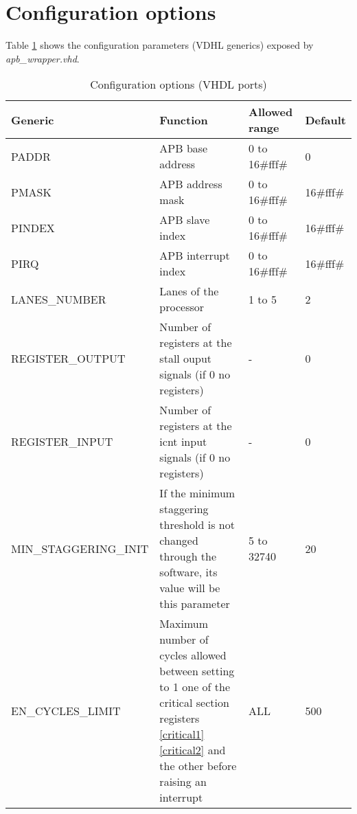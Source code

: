 \section{Configuration options}
\label{confg_chap}
Table \ref{generics} shows the configuration parameters (VDHL generics) exposed by \textit{apb\_wrapper.vhd}. 
\\
\begin{table}[H]
	\caption{Configuration options (VHDL ports)}
	\label{generics}
	\centering
	\begin{small}
		\begin{tabular}{|l|p{6cm}|l|l|}
			\hline
			\textbf{Generic} & \textbf{Function}  & \textbf{Allowed range}  & \textbf{Default}\\
			\hline
			PADDR  & APB base address &0 to 16\#fff\# & 0\\
			\hline
			PMASK  & APB address mask &0 to 16\#fff\# & 16\#fff\#\\
			\hline
			PINDEX & APB slave index &0 to 16\#fff\# & 16\#fff\#\\
			\hline
			PIRQ   & APB interrupt index &0 to 16\#fff\# & 16\#fff\#\\
			\hline
			LANES\_NUMBER & Lanes of the processor & 1 to 5 & 2\\
			\hline
                        REGISTER\_OUTPUT & Number of registers at the stall ouput signals (if 0 no registers) & - & 0 \\
			\hline
			REGISTER\_INPUT & Number of registers at the icnt input signals (if 0 no registers) & - & 0 \\
			\hline
			MIN\_STAGGERING\_INIT & If the minimum staggering threshold is not changed through the software, its value will be this parameter& 5 to 32740 & 20 \\
			\hline
                        EN\_CYCLES\_LIMIT & Maximum number of cycles allowed between setting to 1 one of the critical section registers \ref{critical1} \ref{critical2} and the other before raising an interrupt & ALL & 500 \\
			\hline
		\end{tabular}
	\end{small}
\end{table}

\hspace{2cm}
